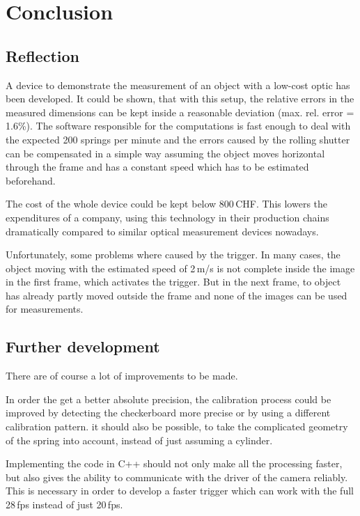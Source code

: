 \chapter{Conclusion}

\section{Reflection}
A device to demonstrate the measurement of an object with a low-cost optic has been developed.
It could be shown, that with this setup, the relative errors in the measured dimensions can be kept inside a reasonable deviation (max. rel. error = 1.6\%).
The software responsible for the computations is fast enough to deal with the expected 200 springs per minute and the errors caused by the rolling shutter can be compensated in a simple way assuming the object moves horizontal through the frame and has a constant speed which has to be estimated beforehand.

The cost of the whole device could be kept below 800\,CHF.
This lowers the expenditures of a company, using this technology in their production chains dramatically compared to similar optical measurement devices nowadays.

Unfortunately, some problems where caused by the trigger.
In many cases, the object moving with the estimated speed of 2\,m/s is not complete inside the image in the first frame, which activates the trigger.
But in the next frame, to object has already partly moved outside the frame and none of the images can be used for measurements.

\section{Further development}
There are of course a lot of improvements to be made.

In order the get a better absolute precision, the calibration process could be improved by detecting the checkerboard more precise or by using a different calibration pattern.
it should also be possible, to take the complicated geometry of the spring into account, instead of just assuming a cylinder.

Implementing the code in C++ should not only make all the processing faster, but also gives the ability to communicate with the driver of the camera reliably.
This is necessary in order to develop a faster trigger which can work with the full 28\,fps instead of just 20\,fps.



